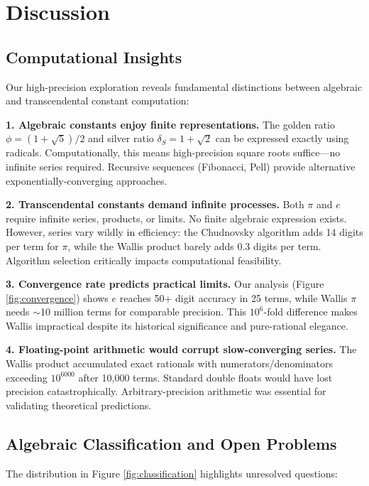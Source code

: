 \documentclass[11pt,a4paper]{article}
\begin{document}
\section{Discussion}

\subsection{Computational Insights}

Our high-precision exploration reveals fundamental distinctions between algebraic and transcendental constant computation:

\textbf{1. Algebraic constants enjoy finite representations.} The golden ratio $\phi = (1 + \sqrt{5})/2$ and silver ratio $\delta_S = 1 + \sqrt{2}$ can be expressed exactly using radicals. Computationally, this means high-precision square roots suffice—no infinite series required. Recursive sequences (Fibonacci, Pell) provide alternative exponentially-converging approaches.

\textbf{2. Transcendental constants demand infinite processes.} Both $\pi$ and $e$ require infinite series, products, or limits. No finite algebraic expression exists. However, series vary wildly in efficiency: the Chudnovsky algorithm adds 14 digits per term for $\pi$, while the Wallis product barely adds 0.3 digits per term. Algorithm selection critically impacts computational feasibility.

\textbf{3. Convergence rate predicts practical limits.} Our analysis (Figure \ref{fig:convergence}) shows $e$ reaches 50+ digit accuracy in 25 terms, while Wallis $\pi$ needs $\sim$10 million terms for comparable precision. This $10^6$-fold difference makes Wallis impractical despite its historical significance and pure-rational elegance.

\textbf{4. Floating-point arithmetic would corrupt slow-converging series.} The Wallis product accumulated exact rationals with numerators/denominators exceeding $10^{6000}$ after 10,000 terms. Standard double floats would have lost precision catastrophically. Arbitrary-precision arithmetic was essential for validating theoretical predictions.

\subsection{Algebraic Classification and Open Problems}

The distribution in Figure \ref{fig:classification} highlights unresolved questions:
\end{document}
